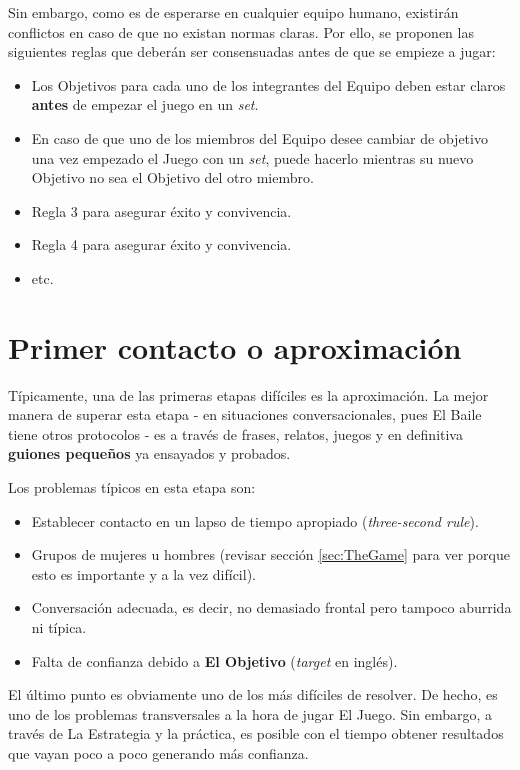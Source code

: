 \documentclass{article}
\begin{document}
Sin embargo, como es de esperarse en cualquier equipo humano, existirán conflictos en caso de que no existan normas claras. Por ello, se proponen las siguientes reglas que deberán ser consensuadas antes de que se empieze a jugar:

\begin{itemize}
\item Los Objetivos para cada uno de los integrantes del Equipo deben estar claros \textbf{antes} de empezar el juego en un \textit{set}.
\item En caso de que uno de los miembros del Equipo desee cambiar de objetivo una vez empezado el Juego con un \textit{set}, puede hacerlo mientras su nuevo Objetivo no sea el Objetivo del otro miembro.
\item {\color{red}Regla 3 para asegurar éxito y convivencia}.
\item {\color{red}Regla 4 para asegurar éxito y convivencia}.
\item {\color{red}etc.}
\end{itemize}
\section{Primer contacto o aproximación}

Típicamente, una de las primeras etapas difíciles es la aproximación. La mejor manera de superar esta etapa - en situaciones conversacionales, pues El Baile tiene otros protocolos - es a través de frases, relatos, juegos y en definitiva \textbf{guiones pequeños} ya ensayados y probados.

Los problemas típicos en esta etapa son:
\begin{itemize}
\item Establecer contacto en un lapso de tiempo apropiado (\textit{three-second rule}).
\item Grupos de mujeres u hombres (revisar sección \ref{sec:TheGame} para ver porque esto es importante y a la vez difícil).
\item Conversación adecuada, es decir, no demasiado frontal pero tampoco aburrida ni típica.
\item Falta de confianza debido a \textbf{El Objetivo} (\textit{target} en inglés).
\end{itemize}

El último punto es obviamente uno de los más difíciles de resolver. De hecho, es uno de los problemas transversales a la hora de jugar El Juego. Sin embargo, a través de La Estrategia y la práctica, es posible con el tiempo obtener resultados que vayan poco a poco generando más confianza.
\end{document}
